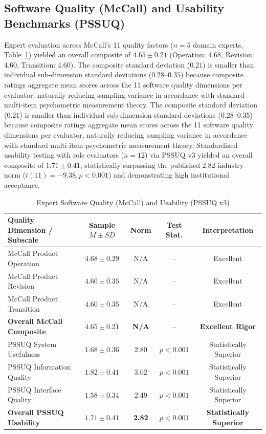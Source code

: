 \documentclass[conference]{IEEEtran}
\begin{document}
\subsection{Software Quality (McCall) and Usability Benchmarks (PSSUQ)}
Expert evaluation across McCall's 11 quality factors ($n = 5$ domain experts, Table~\ref{tab7}) yielded an overall composite of $4.65 \pm 0.21$ (Operation: 4.68, Revision: 4.60, Transition: 4.60). The composite standard deviation ($0.21$) is smaller than individual sub-dimension standard deviations ($0.28$--$0.35$) because composite ratings aggregate mean scores across the 11 software quality dimensions per evaluator, naturally reducing sampling variance in accordance with standard multi-item psychometric measurement theory. The composite standard deviation ($0.21$) is smaller than individual sub-dimension standard deviations ($0.28$--$0.35$) because composite ratings aggregate mean scores across the 11 software quality dimensions per evaluator, naturally reducing sampling variance in accordance with standard multi-item psychometric measurement theory. Standardized usability testing with role evaluators ($n = 12$) via PSSUQ v3 yielded an overall composite of $1.71 \pm 0.41$, statistically surpassing the published 2.82 industry norm ($t(11) = -9.38, p < 0.001$) and demonstrating high institutional acceptance.

\begin{table}[htbp]
\caption{Expert Software Quality (McCall) and Usability (PSSUQ v3)}
\label{tab7}
\centering
\small
\begin{tabular}{lcccc}
\toprule
\textbf{Quality Dimension / Subscale} & \textbf{Sample $M \pm SD$} & \textbf{Norm} & \textbf{Test Stat.} & \textbf{Interpretation} \\
\midrule
McCall Product Operation & $4.68 \pm 0.29$ & N/A & -- & Excellent \\
McCall Product Revision & $4.60 \pm 0.35$ & N/A & -- & Excellent \\
McCall Product Transition & $4.60 \pm 0.35$ & N/A & -- & Excellent \\
\textbf{Overall McCall Composite} & \textbf{$4.65 \pm 0.21$} & \textbf{N/A} & -- & \textbf{Excellent Rigor} \\
PSSUQ System Usefulness & $1.68 \pm 0.36$ & 2.80 & $p < 0.001$ & Statistically Superior \\
PSSUQ Information Quality & $1.82 \pm 0.41$ & 3.02 & $p < 0.001$ & Statistically Superior \\
PSSUQ Interface Quality & $1.58 \pm 0.34$ & 2.49 & $p < 0.001$ & Statistically Superior \\
\textbf{Overall PSSUQ Usability} & \textbf{$1.71 \pm 0.41$} & \textbf{2.82} & \textbf{$p < 0.001$} & \textbf{Statistically Superior} \\
\bottomrule
\end{tabular}
\end{table}
\end{document}
